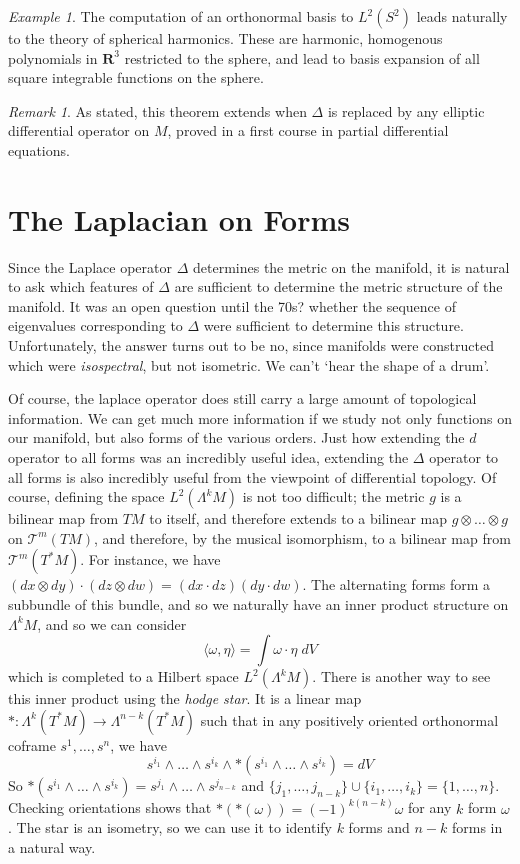 \documentclass{article}
\theoremstyle{plain}
\theoremstyle{remark}
\newtheorem*{example}{Example}
\newtheorem*{remark}{Remark}
\theoremstyle{definition}
\begin{document}
\begin{example}
    The computation of an orthonormal basis to $L^2(S^2)$ leads naturally to the theory of spherical harmonics. These are harmonic, homogenous polynomials in $\mathbf{R}^3$ restricted to the sphere, and lead to basis expansion of all square integrable functions on the sphere.
\end{example}

\begin{remark}
    As stated, this theorem extends when $\Delta$ is replaced by any elliptic differential operator on $M$, proved in a first course in partial differential equations.
\end{remark}

\section{The Laplacian on Forms}

Since the Laplace operator $\Delta$ determines the metric on the manifold, it is natural to ask which features of $\Delta$ are sufficient to determine the metric structure of the manifold. It was an open question until the 70s? whether the sequence of eigenvalues corresponding to $\Delta$ were sufficient to determine this structure. Unfortunately, the answer turns out to be no, since manifolds were constructed which were {\it isospectral}, but not isometric. We can't `hear the shape of a drum'.

Of course, the laplace operator does still carry a large amount of topological information. We can get much more information if we study not only functions on our manifold, but also forms of the various orders. Just how extending the $d$ operator to all forms was an incredibly useful idea, extending the $\Delta$ operator to all forms is also incredibly useful from the viewpoint of differential topology. Of course, defining the space $L^2(\Lambda^k M)$ is not too difficult; the metric $g$ is a bilinear map from $TM$ to itself, and therefore extends to a bilinear map $g \otimes \dots \otimes g$ on $\mathcal{T}^m(TM)$, and therefore, by the musical isomorphism, to a bilinear map from $\mathcal{T}^m(T^*M)$. For instance, we have $(dx \otimes dy) \cdot (dz \otimes dw) = (dx \cdot dz) (dy \cdot dw)$. The alternating forms form a subbundle of this bundle, and so we naturally have an inner product structure on $\Lambda^k M$, and so we can consider
%
\[ \langle \omega, \eta \rangle = \int \omega \cdot \eta\; dV \]
%
which is completed to a Hilbert space $L^2(\Lambda^k M)$. There is another way to see this inner product using the {\it hodge star}. It is a linear map $*: \Lambda^k(T^*M) \to \Lambda^{n-k}(T^*M)$ such that in any positively oriented orthonormal coframe $s^1, \dots, s^n$, we have
%
\[ s^{i_1} \wedge \dots \wedge s^{i_k} \wedge *(s^{i_1} \wedge \dots \wedge s^{i_k}) = dV \]
%
So $*(s^{i_1} \wedge \dots \wedge s^{i_k}) = s^{j_1} \wedge \dots \wedge s^{j_{n-k}}$ and $\{ j_1, \dots, j_{n-k} \} \cup \{ i_1, \dots, i_k \} = \{ 1, \dots, n \}$. Checking orientations shows that $*(*(\omega)) = (-1)^{k(n-k)} \omega$ for any $k$ form $\omega$. The star is an isometry, so we can use it to identify $k$ forms and $n-k$ forms in a natural way.
\end{document}
